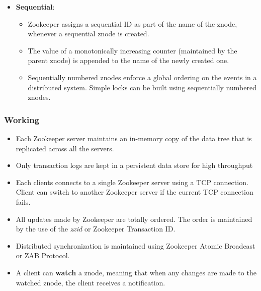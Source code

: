 \documentclass{article}
\begin{document}
\begin{itemize}
\begin{itemize}
        \item \textbf{Sequential}: 
        \begin{itemize}
            \item Zookeeper assigns a sequential ID as part of the name of the znode, whenever a sequential znode is created. 
            
            \item The value of a monotonically increasing counter (maintained by the parent znode) is appended to the name of the newly created one. 
            
            \item Sequentially numbered znodes enforce a global ordering on the events in a distributed system. Simple locks can be built using sequentially numbered znodes.
        \end{itemize}
    \end{itemize}
\end{itemize}

\subsubsection{Working}
\begin{itemize}
    \item Each Zookeeper server maintains an in-memory copy of the data tree that is replicated across all the servers. 
    
    \item Only transaction logs are kept in a persistent data store for high throughput
    
    \item Each clients connects to a single Zookeeper server using a TCP connection. Client can switch to another Zookeeper server if the current TCP connection fails. 
    
    \item All updates made by Zookeeper are totally ordered. The order is maintained by the use of the \textit{zxid} or Zookeeper Transaction ID. 
    
    \item Distributed synchronization is maintained using Zookeeper Atomic Broadcast or ZAB Protocol. 
    
    \item A client can \textbf{watch} a znode, meaning that when any changes are made to the watched znode, the client receives a notification. 
\end{itemize}
\end{document}
